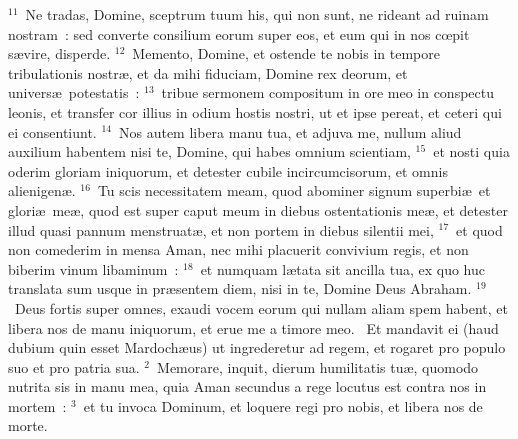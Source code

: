 ${}^{11}$~Ne tradas, Domine, sceptrum tuum his, qui non sunt, ne rideant ad ruinam nostram~: sed converte consilium eorum super eos, et eum qui in nos cœpit s\ae vire, disperde.
${}^{12}$~Memento, Domine, et ostende te nobis in tempore tribulationis nostr\ae , et da mihi fiduciam, Domine rex deorum, et univers\ae\ potestatis~:
${}^{13}$~tribue sermonem compositum in ore meo in conspectu leonis, et transfer cor illius in odium hostis nostri, ut et ipse pereat, et ceteri qui ei consentiunt.
${}^{14}$~Nos autem libera manu tua, et adjuva me, nullum aliud auxilium habentem nisi te, Domine, qui habes omnium scientiam,
${}^{15}$~et nosti quia oderim gloriam iniquorum, et detester cubile incircumcisorum, et omnis alienigen\ae .
${}^{16}$~Tu scis necessitatem meam, quod abominer signum superbi\ae\ et glori\ae\ me\ae , quod est super caput meum in diebus ostentationis me\ae , et detester illud quasi pannum menstruat\ae , et non portem in diebus silentii mei,
${}^{17}$~et quod non comederim in mensa Aman, nec mihi placuerit convivium regis, et non biberim vinum libaminum~:
${}^{18}$~et numquam l\ae tata sit ancilla tua, ex quo huc translata sum usque in pr\ae sentem diem, nisi in te, Domine Deus Abraham.
${}^{19}$~Deus fortis super omnes, exaudi vocem eorum qui nullam aliam spem habent, et libera nos de manu iniquorum, et erue me a timore meo.
~\lettrine[lines=10,image=true,loversize=0.05,lraise=-0.03]{E}{}t mandavit ei (haud dubium quin esset Mardoch\ae us) ut ingrederetur ad regem, et rogaret pro populo suo et pro patria sua.
${}^{2}$~Memorare, inquit, dierum humilitatis tu\ae , quomodo nutrita sis in manu mea, quia Aman secundus a rege locutus est contra nos in mortem~:
${}^{3}$~et tu invoca Dominum, et loquere regi pro nobis, et libera nos de morte.


